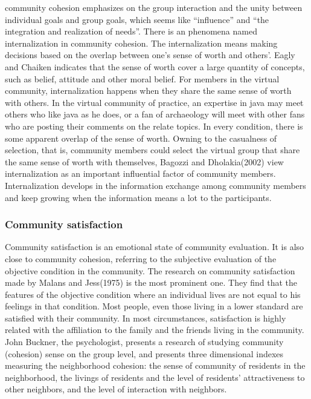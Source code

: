 \documentclass{elsarticle}
\begin{document}
community cohesion emphasizes on the group interaction and the
unity between individual goals and group goals, which seems like
“influence” and “the integration and realization of needs”. There is
an phenomena named internalization in community cohesion. The
internalization means making decisions based on the overlap between
one’s sense of worth and others’. Eagly and Chaiken indicates that the
sense of worth cover a large quantity of concepts, such as belief,
attitude and other moral belief\cite{eagly1993pa}. For members in the virtual
community, internalization happens when they share the same sense of
worth with others. In the virtual community of practice, an expertise
in java may meet others who like java as he does, or a fan of
archaeology will meet with other fans who are posting their comments
on the relate topics. In every condition, there is some apparent
overlap of the sense of worth. Owning to the casualness of selection,
that is, community members could select the virtual group that share
the same sense of worth with themselves, Bagozzi and Dholakia(2002)
view internalization as an important influential factor of community
members\cite{richard_p._bagozzi_intentional_2002}. Internalization develops in the information exchange among
community members and keep growing when the information means a lot to
the participants. 

\subsubsection{Community satisfaction}
\label{sec:comm-satisf}

Community satisfaction is an emotional state of community
evaluation. It is also close to community cohesion, referring to the
subjective evaluation of the objective condition in the community. The
research on community satisfaction made by Malans and Jess(1975) is
the most prominent one. They find that the features of the objective
condition where an individual lives are not equal to his feelings in
that condition. Most people, even those living in a lower standard are
satisfied with their community. In most circumstances, satisfaction is
highly related with the affiliation to the family and the friends
living in the community\cite{marans1975tuc}. John Buckner, the psychologist, presents
a research of studying community (cohesion) sense on the group level,
and presents three dimensional indexes measuring the neighborhood
cohesion: the sense of community of residents in the neighborhood, the
livings of residents and the level of residents’ attractiveness to
other neighbors, and the level of interaction with
neighbors\cite{buckner1988dim}.
\end{document}
